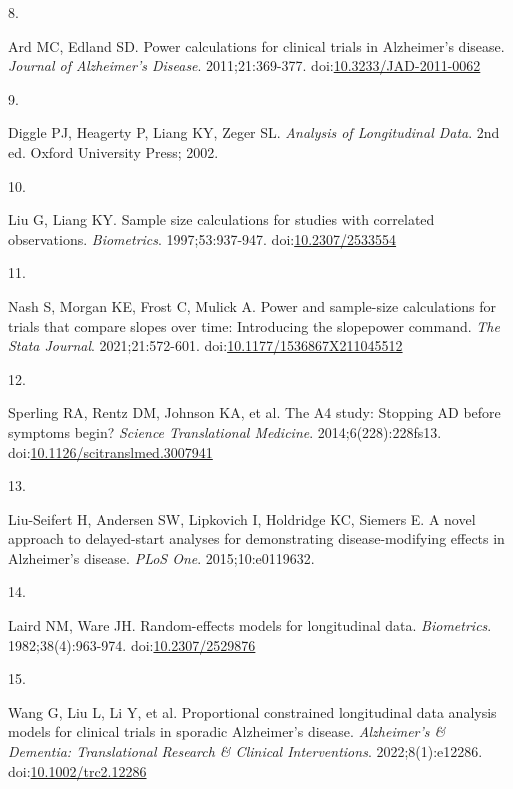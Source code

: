 \documentclass[
  11pt,
]{article}
\newlength{\cslhangindent}
\newlength{\csllabelwidth}
\newenvironment{CSLReferences}[2] %
 {\begin{list}{}{%
  \setlength{\itemindent}{0pt}
  \setlength{\leftmargin}{0pt}
  \setlength{\parsep}{0pt}
  \ifodd #1
   \setlength{\leftmargin}{\cslhangindent}
   \setlength{\itemindent}{-1\cslhangindent}
  \fi
  \setlength{\itemsep}{#2\baselineskip}}}
 {\end{list}}
\newcommand{\CSLLeftMargin}[1]{\parbox[t]{\csllabelwidth}{\strut#1\strut}}
\newcommand{\CSLRightInline}[1]{\parbox[t]{\linewidth - \csllabelwidth}{\strut#1\strut}}
\begin{document}
\begin{CSLReferences}{0}{1}
\CSLLeftMargin{8. }%
\CSLRightInline{Ard MC, Edland SD. Power calculations for clinical trials in {Alzheimer's} disease. \emph{Journal of Alzheimer's Disease}. 2011;21:369-377. doi:\href{https://doi.org/10.3233/JAD-2011-0062}{10.3233/JAD-2011-0062}}

\CSLLeftMargin{9. }%
\CSLRightInline{Diggle PJ, Heagerty P, Liang KY, Zeger SL. \emph{Analysis of Longitudinal Data}. 2nd ed. Oxford University Press; 2002.}

\CSLLeftMargin{10. }%
\CSLRightInline{Liu G, Liang KY. Sample size calculations for studies with correlated observations. \emph{Biometrics}. 1997;53:937-947. doi:\href{https://doi.org/10.2307/2533554}{10.2307/2533554}}

\CSLLeftMargin{11. }%
\CSLRightInline{Nash S, Morgan KE, Frost C, Mulick A. Power and sample-size calculations for trials that compare slopes over time: Introducing the slopepower command. \emph{The Stata Journal}. 2021;21:572-601. doi:\href{https://doi.org/10.1177/1536867X211045512}{10.1177/1536867X211045512}}

\CSLLeftMargin{12. }%
\CSLRightInline{Sperling RA, Rentz DM, Johnson KA, et al. The {A4} study: Stopping {AD} before symptoms begin? \emph{Science Translational Medicine}. 2014;6(228):228fs13. doi:\href{https://doi.org/10.1126/scitranslmed.3007941}{10.1126/scitranslmed.3007941}}

\CSLLeftMargin{13. }%
\CSLRightInline{Liu-Seifert H, Andersen SW, Lipkovich I, Holdridge KC, Siemers E. A novel approach to delayed-start analyses for demonstrating disease-modifying effects in {Alzheimer's} disease. \emph{PLoS One}. 2015;10:e0119632.}

\CSLLeftMargin{14. }%
\CSLRightInline{Laird NM, Ware JH. Random-effects models for longitudinal data. \emph{Biometrics}. 1982;38(4):963-974. doi:\href{https://doi.org/10.2307/2529876}{10.2307/2529876}}

\CSLLeftMargin{15. }%
\CSLRightInline{Wang G, Liu L, Li Y, et al. Proportional constrained longitudinal data analysis models for clinical trials in sporadic {Alzheimer's} disease. \emph{Alzheimer's \& Dementia: Translational Research \& Clinical Interventions}. 2022;8(1):e12286. doi:\href{https://doi.org/10.1002/trc2.12286}{10.1002/trc2.12286}}


\end{CSLReferences}
\end{document}
